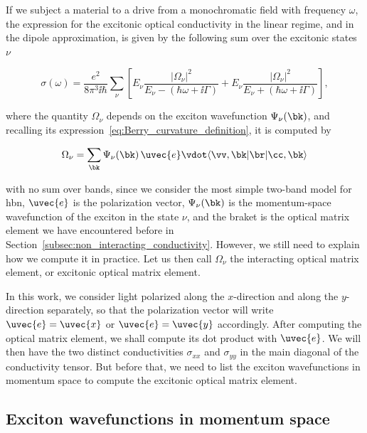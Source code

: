 If we subject a material to a drive from a monochromatic field with frequency $\omega$, the expression for the excitonic optical conductivity in the linear regime, and in the dipole approximation, is given by the following sum over the excitonic states $\nu$~\cite{Pedersen_2015}

\begin{equation}
    \sigma (\omega) = \frac{e^2}{8 \pi^3 \ii \hbar} \sum_\nu \left[ E_\nu \frac{|\Omega_\nu|^2 }{E_\nu - (\hbar \omega+\ii\Gamma)} + E_\nu \frac{|\Omega_\nu|^2 }{E_\nu + (\hbar \omega+\ii\Gamma)} \right] ,
    \label{eq:optical_conductivity}
\end{equation}

\noindent where the quantity $\Omega_\nu$ depends on the exciton wavefunction $\Psi_\nu(\bk)$, and recalling its expression~\eqref{eq:Berry_curvature_definition}, it is computed by

\begin{equation}
    \label{eq:Berry_curvature_definition_new}
    \Omega_\nu =  \sum_{\bk} \Psi_{\nu} (\bk)\, \uvec{e} \vdot \langle \vv ,\bk | \br | \cc,\bk \rangle
\end{equation}

\noindent with no sum over bands, since we consider the most simple two-band model for \gls{hbn}, $\uvec{e}$ is the polarization vector, $\Psi_{\nu} (\bk)$ is the momentum-space wavefunction of the exciton in the state $\nu$, and the braket is the optical matrix element we have encountered before in Section~\ref{subsec:non_interacting_conductivity}.
However, we still need to explain how we compute it in practice.
Let us then call $\Omega_\nu$ the interacting optical matrix element, or excitonic optical matrix element.

In this work, we consider light polarized along the $x$-direction and along the $y$-direction separately, so that the polarization vector will write $\uvec{e} = \uvec{x}$ or $\uvec{e} = \uvec{y}$ accordingly.
After computing the optical matrix element, we shall compute its dot product with $\uvec{e}$.
We will then have the two distinct conductivities $\sigma_{xx}$ and $\sigma_{yy}$ in the main diagonal of the conductivity tensor.
But before that, we need to list the exciton wavefunctions in momentum space to compute the excitonic optical matrix element.

\subsection{Exciton wavefunctions in momentum space}
\label{subsec:exciton_wavefunctions_momentum_space}

